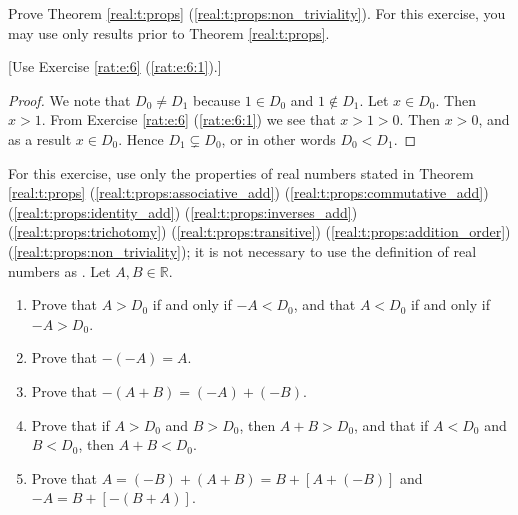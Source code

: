 \Newpage
\begin{exercise} %
	\label{real:e:3}
	Prove Theorem \ref{real:t:props} (\ref{real:t:props:non_triviality}). For this exercise, you may use only results prior to Theorem \ref{real:t:props}.

	\hfill [Use Exercise \ref{rat:e:6} (\ref{rat:e:6:1}).]
\end{exercise}

\begin{proof}
	We note that $D_0 \neq D_1$ because $1 \in D_0$ and $1 \notin D_1$. Let $x \in D_0$. Then $x > 1$. From Exercise \ref{rat:e:6} (\ref{rat:e:6:1}) we see that $x > 1 > 0$. Then $x > 0$, and as a result $x \in D_0$. Hence $D_1 \subsetneq D_0$, or in other words $D_0 < D_1$.
\end{proof}


\Newpage
\begin{exercise} %
	\label{real:e:4}
	For this exercise, use only the properties of real numbers stated in Theorem \ref{real:t:props} (\ref{real:t:props:associative_add}) (\ref{real:t:props:commutative_add}) (\ref{real:t:props:identity_add}) (\ref{real:t:props:inverses_add}) (\ref{real:t:props:trichotomy}) (\ref{real:t:props:transitive}) (\ref{real:t:props:addition_order}) (\ref{real:t:props:non_triviality}); it is not necessary to use the definition of real numbers as . Let $A, B \in \mathbb{R}$.
	\begin{enumerate}
		\item \label{real:e:4:1}
		      Prove that $A > D_0$ if and only if $-A < D_0$, and that $A < D_0$ if and only if $-A > D_0$.
		\item \label{real:e:4:2}
		      Prove that $-(-A) = A$.
		\item \label{real:e:4:3}
		      Prove that $-(A + B) = (-A) + (-B)$.
		\item \label{real:e:4:4}
		      Prove that if $A > D_0$ and $B > D_0$, then $A + B > D_0$, and that if $A < D_0$ and $B < D_0$, then $A + B < D_0$.
		\item \label{real:e:4:5}
		      Prove that $A = (-B) + (A + B) = B + [A + (-B)]$ and $-A = B + [-(B + A)]$.
	\end{enumerate}
\end{exercise}


